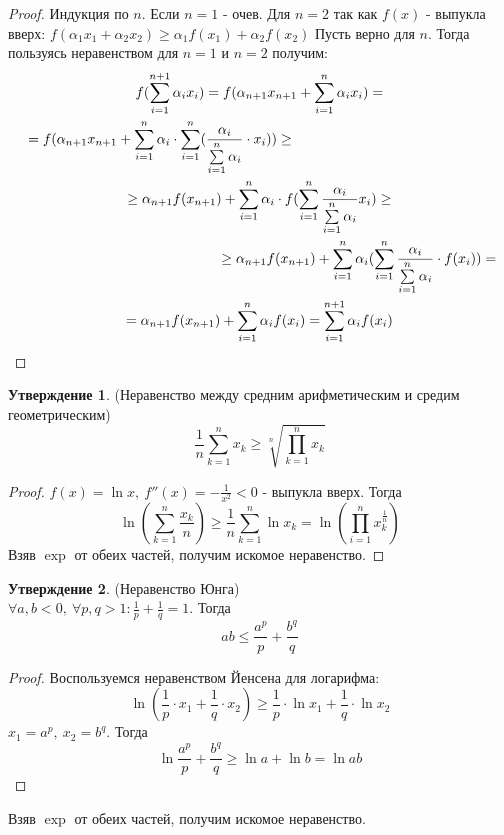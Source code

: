 \documentclass[a4paper, 12pt]{article}
\newcommand\tab[1][.5cm]{\hspace*{#1}}
\theoremstyle{definition}
\newtheorem*{statement}{Утверждение}
\begin{document}
        \begin{proof}
            Индукция по $n$. Если $n=1$ - очев. Для $n=2$ так как $f(x)$ - выпукла вверх: 
            $f(\alpha_1 x_1+\alpha_2 x_2)\geq \alpha_1 f(x_1)+\alpha_2 f(x_2)$
            Пусть верно для $n$. Тогда пользуясь неравенством для $n=1$ и $n=2$ получим:
            \begin{multline*}
                f(\sum\limits_{i=1}^{n+1}\alpha_i x_i)=f(\alpha_{n+1}x_{n+1}+\sum\limits_{i=1}^{n}\alpha_i x_i)=\\
                =f(\alpha_{n+1}x_{n+1}+\sum\limits_{i=1}^{n}\alpha_i \cdot \sum\limits_{i=1}^{n}(\frac{\alpha_i}{\sum\limits_{i=1}^{n}\alpha_i}\cdot x_i))\geq\tab[5cm]\\
                \geq \alpha_{n+1} f(x_{n+1})+\sum\limits_{i=1}^{n}\alpha_i\cdot f(\sum\limits_{i=1}^{n}\frac{\alpha_i}{\sum\limits_{i=1}^{n}\alpha_i} x_i)\geq\\
                \tab[5cm]\geq \alpha_{n+1} f(x_{n+1})+\sum\limits_{i=1}^{n}\alpha_i(\sum\limits_{i=1}^{n}\frac{\alpha_i}{\sum\limits_{i=1}^{n}\alpha_i}\cdot f(x_i))=\\
                =\alpha_{n+1}f(x_{n+1})+\sum\limits_{i=1}^{n}\alpha_i f(x_i)=\sum\limits_{i=1}^{n+1}\alpha_i f(x_i)
            \end{multline*}
        \end{proof} 
        \begin{statement}
            (Неравенство между средним арифметическим и средим геометрическим)
            \[\frac{1}{n}\sum\limits_{k=1}^{n}x_k\geq \sqrt[n]{\prod\limits_{k=1}^{n}x_k}\]
        \end{statement}
        \begin{proof}
            $f(x)=\ln{x},\ f''(x)=-\frac{1}{x^2}<0$ - выпукла вверх. Тогда
            \[\ln({\sum\limits_{k=1}^{n}\frac{x_k}{n}})\geq \frac{1}{n} \sum\limits_{k=1}^{n}\ln{x_k}=\ln({\prod\limits_{i=1}^{n}x_k^{\frac{1}{n}}})\]
            Взяв $\exp$ от обеих частей, получим искомое неравенство.
        \end{proof} 
        \begin{statement}
            (Неравенство Юнга)\\
            $\forall a,b<0,\ \forall p,q>1: \frac{1}{p}+\frac{1}{q}=1$. Тогда 
            \[ab\leq \frac{a^p}{p}+\frac{b^q}{q}\]
        \end{statement}
        \begin{proof}
            Воспользуемся неравенством Йенсена для логарифма:
            \[\ln({\frac{1}{p}\cdot x_1+\frac{1}{q}\cdot x_2})\geq \frac{1}{p}\cdot \ln{x_1}+\frac{1}{q}\cdot \ln{x_2}\]
            $x_1=a^p,\ x_2=b^q$. Тогда
            \[\ln{\frac{a^p}{p}+\frac{b^q}{q}}\geq \ln{a}+\ln{b}=\ln{ab}\]
        \end{proof} 
        Взяв $\exp$ от обеих частей, получим искомое неравенство.
\end{document}
